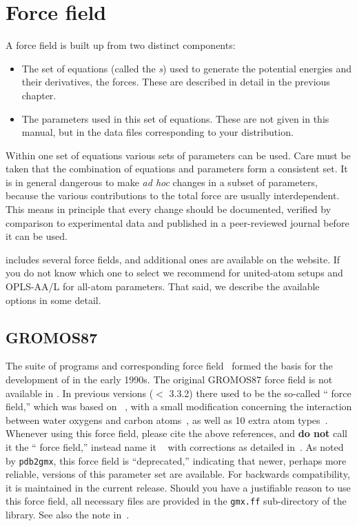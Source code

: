 \section{Force field}
\label{sec:ff}
A force field is built up from two distinct components:
\begin{itemize}
\item The set of equations (called the {\em
    s}) used to generate the potential
  energies and their derivatives, the forces. These are described in
  detail in the previous chapter.
\item The parameters used in this set of equations. These are not
  given in this manual, but in the data files corresponding to your
  {\gromacs} distribution.
\end{itemize}
Within one set of equations various sets of parameters can be
used. Care must be taken that the combination of equations and
parameters form a consistent set. It is in general dangerous to make
{\em ad hoc} changes in a subset of parameters, because the various
contributions to the total force are usually interdependent. This
means in principle that every change should be documented, verified by
comparison to experimental data and published in a peer-reviewed
journal before it can be used.

{\gromacs} {\gmxver} includes several force fields, and additional
ones are available on the website. If you do not know which one to
select we recommend  for united-atom setups and OPLS-AA/L for
all-atom parameters. That said, we describe the available options in
some detail.

\subsection{GROMOS87}
The  suite of programs and corresponding force
field~\cite{biomos} formed the basis for the development of {\gromacs}
in the early 1990s.  The original GROMOS87 force field is not
available in {\gromacs}. In previous versions ($<$ 3.3.2) there used
to be the so-called ``{\gromacs} force field,'' which was based on
~\cite{biomos}, with a small modification
concerning the interaction between water oxygens and carbon
atoms~\cite{Buuren93b,Mark94}, as well as 10 extra atom
types~\cite{Jorgensen83,Buuren93a,Buuren93b,Mark94,Liu95}. Whenever
using this force field, please cite the above references, and {\bf do not}
call it the ``{\gromacs} force field,'' instead name it
~\cite{biomos} with corrections as detailed
in~\cite{Buuren93b,Mark94}.  As noted by {\tt pdb2gmx}, this force field is
``deprecated,'' indicating that newer, perhaps more reliable, versions of this
parameter set are available.  For backwards compatibility, it is maintained 
in the current release.  Should you have a justifiable reason to use this
force field, all necessary files are provided in the {\tt gmx.ff} sub-directory
of the {\gromacs} library.  See also the note in~.

